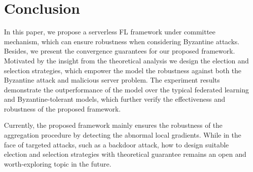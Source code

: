 \documentclass[10pt,journal,compsoc]{IEEEtran}
\begin{document}
\section{Conclusion}
\label{conclusion}

In this paper, we propose a serverless FL framework under committee mechanism, which can ensure robustness when considering Byzantine attacks. Besides, we present the convergence guarantees for our proposed framework. Motivated by the insight from the theoretical analysis we design the election and selection strategies, which empower the model the robustness against both the Byzantine attack and malicious server problem. The experiment results demonstrate the outperformance of the model over the typical federated learning and Byzantine-tolerant models, which further verify the effectiveness and robustness of the proposed framework. 

Currently, the proposed framework mainly ensures the robustness of the aggregation procedure by detecting the abnormal local gradients. While in the face of targeted attacks, such as a backdoor attack, how to design suitable election and selection strategies with theoretical guarantee remains an open and worth-exploring topic in the future. 





%
\end{document}
